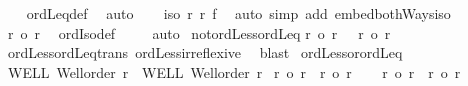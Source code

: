 \begin{isabellebody}
\ \ \isamarkupfalse%
\ ordLeq{\isacharunderscore}{\kern0pt}def\ \isamarkupfalse%
\ auto\isanewline
\ \ \isamarkupfalse%
\ {\isachardoublequoteopen}iso\ r\ r{\isacharprime}{\kern0pt}\ f{\isachardoublequoteclose}\ \isamarkupfalse%
\ {\isacharparenleft}{\kern0pt}auto\ simp\ add{\isacharcolon}{\kern0pt}\ embed{\isacharunderscore}{\kern0pt}bothWays{\isacharunderscore}{\kern0pt}iso{\isacharparenright}{\kern0pt}\isanewline
\ \ \isamarkupfalse%
\ {\isachardoublequoteopen}r\ {\isacharequal}{\kern0pt}o\ r{\isacharprime}{\kern0pt}{\isachardoublequoteclose}\ \isamarkupfalse%
\ ordIso{\isacharunderscore}{\kern0pt}def\ \isamarkupfalse%
\ {}\ \isamarkupfalse%
\ auto\isanewline
{}\isamarkupfalse%
%
\endisatagproof
{\isafoldproof}%
%
\isadelimproof
\isanewline
%
\endisadelimproof
\isanewline
{}\isamarkupfalse%
\ not{\isacharunderscore}{\kern0pt}ordLess{\isacharunderscore}{\kern0pt}ordLeq{\isacharcolon}{\kern0pt}\isanewline
{\isachardoublequoteopen}r\ {\isacharless}{\kern0pt}o\ r{\isacharprime}{\kern0pt}\ {\isasymLongrightarrow}\ {\isasymnot}\ r{\isacharprime}{\kern0pt}\ {\isasymle}o\ r{\isachardoublequoteclose}\isanewline
%
\isadelimproof
%
\endisadelimproof
%
\isatagproof
{}\isamarkupfalse%
\ ordLess{\isacharunderscore}{\kern0pt}ordLeq{\isacharunderscore}{\kern0pt}trans\ ordLess{\isacharunderscore}{\kern0pt}irreflexive\ \isamarkupfalse%
\ blast%
\endisatagproof
{\isafoldproof}%
%
\isadelimproof
\isanewline
%
\endisadelimproof
\isanewline
{}\isamarkupfalse%
\ ordLess{\isacharunderscore}{\kern0pt}or{\isacharunderscore}{\kern0pt}ordLeq{\isacharcolon}{\kern0pt}\isanewline
{}\ WELL{\isacharcolon}{\kern0pt}\ {\isachardoublequoteopen}Well{\isacharunderscore}{\kern0pt}order\ r{\isachardoublequoteclose}\ \ WELL{\isacharprime}{\kern0pt}{\isacharcolon}{\kern0pt}\ {\isachardoublequoteopen}Well{\isacharunderscore}{\kern0pt}order\ r{\isacharprime}{\kern0pt}{\isachardoublequoteclose}\isanewline
{}\ {\isachardoublequoteopen}r\ {\isacharless}{\kern0pt}o\ r{\isacharprime}{\kern0pt}\ {\isasymor}\ r{\isacharprime}{\kern0pt}\ {\isasymle}o\ r{\isachardoublequoteclose}\isanewline
%
\isadelimproof
%
\endisadelimproof
%
\isatagproof
{}\isamarkupfalse%
{\isacharminus}{\kern0pt}\isanewline
\ \ \isamarkupfalse%
\ {\isachardoublequoteopen}r\ {\isasymle}o\ r{\isacharprime}{\kern0pt}\ {\isasymor}\ r{\isacharprime}{\kern0pt}\ {\isasymle}o\ r{\isachardoublequoteclose}\isanewline

\end{isabellebody}
